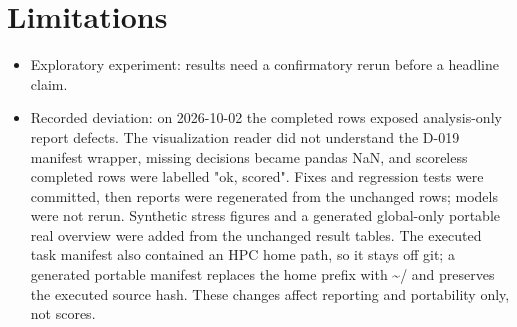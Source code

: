\documentclass{article}
\begin{document}
\section{Limitations}
\begin{itemize}
\item Exploratory experiment: results need a confirmatory rerun before a headline claim.
\item Recorded deviation: on 2026-10-02 the completed rows exposed analysis-only report defects. The visualization reader did not understand the D-019 manifest wrapper, missing decisions became pandas NaN, and scoreless completed rows were labelled "ok, scored". Fixes and regression tests were committed, then reports were regenerated from the unchanged rows; models were not rerun. Synthetic stress figures and a generated global-only portable real overview were added from the unchanged result tables. The executed task manifest also contained an HPC home path, so it stays off git; a generated portable manifest replaces the home prefix with \textasciitilde{}/ and preserves the executed source hash. These changes affect reporting and portability only, not scores.
\end{itemize}
\end{document}

